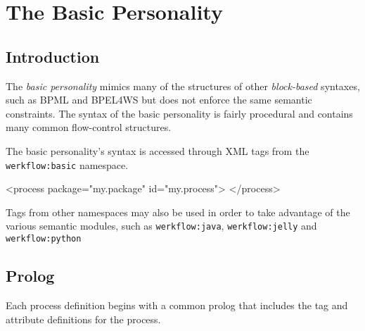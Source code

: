
\chapter{The Basic Personality}


\section{Introduction}

The \emph{basic personality} mimics many of the structures
of other \emph{block-based} syntaxes, such as BPML and BPEL4WS
but does not enforce the same semantic constraints.  The syntax of
the basic personality is fairly procedural and contains many common
flow-control structures.

The basic personality's syntax is accessed through XML tags from
the \verb|werkflow:basic| namespace.

\begin{codelisting}
<process 
         package="my.package"
         id="my.process">
</process>
\end{codelisting}

Tags from other namespaces may also be used in order to 
take advantage of the various semantic modules, such
as \verb|werkflow:java|, \verb|werkflow:jelly| and 
\verb|werkflow:python|


\section{Prolog}

Each process definition begins with a common prolog that includes
the  tag and attribute definitions for the process.

\subsection{}

